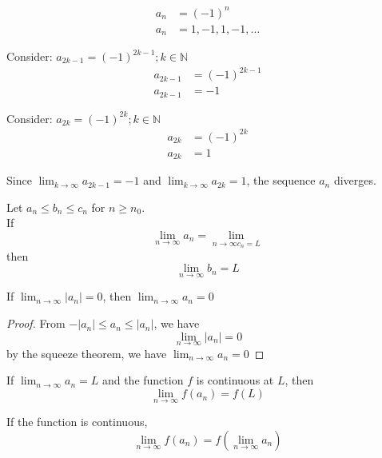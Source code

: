 \begin{equation}
  \begin{aligned}
    a_{n} &= (-1)^{n} \\
    a_{n} &= 1, -1, 1, -1, \dots
  \end{aligned}
\end{equation}

Consider: $a_{2k-1} = (-1)^{2k-1}; k \in \mathbb{N}$
\begin{equation}
  \begin{aligned}
    a_{2k-1} &= (-1)^{2k-1} \\
    a_{2k-1} &= -1
  \end{aligned}
\end{equation}

Consider: $a_{2k} = (-1)^{2k}; k \in \mathbb{N}$
\begin{equation}
  \begin{aligned}
    a_{2k} &= (-1)^{2k} \\
    a_{2k} &= 1
  \end{aligned}
\end{equation}

Since $\lim_{k \to \infty} a_{2k-1} = -1$ and $\lim_{k \to \infty} a_{2k} = 1$, the sequence $a_{n}$ diverges.

\begin{theorem}
  Let \(a_{n} \le b_{n} \le c_{n}\) for \(n \ge n_{0}\). \\
  If 
  \[
    \lim_{n \to \infty} a_n = \lim_{n \to \infty c_n = L}
  \]
  then
  \[
    \lim_{n \to \infty} b_{n} = L
  \]
\end{theorem}

\begin{theorem}
  If \(\lim_{n \to \infty} |a_{n}| = 0\), then \(\lim_{n \to \infty} a_{n} = 0\) 
\end{theorem}

\begin{proof}
  From $-|a_{n}| \le a_{n} \le |a_{n}|$, we have
  \[
    \lim_{n \to \infty} |a_{n}| = 0
  \]
  by the squeeze theorem, we have $\lim_{n \to \infty} a_{n} = 0$
\end{proof}

\begin{theorem}
  If \(\lim_{n \to \infty} a_{n} = L\) and the function $f$ is continuous at $L$, then
  \[
    \lim_{n \to \infty} f(a_{n}) = f(L)
  \]
\end{theorem}

\begin{remark}
  If the function is continuous,
  \[
    \lim_{n \to \infty} f(a_{n}) = f(\lim_{n \to \infty} a_{n})
  \]
\end{remark}

